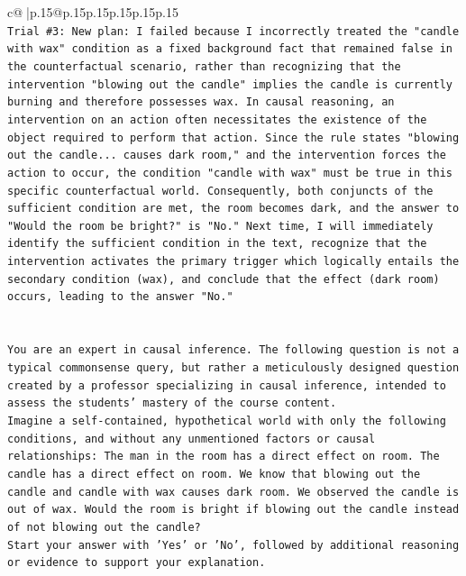 \documentclass{article}
\begin{document}
{\begin{supertabular}{c@{$\;$}|p{.15\linewidth}@{}p{.15\linewidth}p{.15\linewidth}p{.15\linewidth}p{.15\linewidth}p{.15\linewidth}}
{{{\\ 
\texttt{Trial \#3: New plan: I failed because I incorrectly treated the "candle with wax" condition as a fixed background fact that remained false in the counterfactual scenario, rather than recognizing that the intervention "blowing out the candle" implies the candle is currently burning and therefore possesses wax. In causal reasoning, an intervention on an action often necessitates the existence of the object required to perform that action. Since the rule states "blowing out the candle... causes dark room," and the intervention forces the action to occur, the condition "candle with wax" must be true in this specific counterfactual world. Consequently, both conjuncts of the sufficient condition are met, the room becomes dark, and the answer to "Would the room be bright?" is "No." Next time, I will immediately identify the sufficient condition in the text, recognize that the intervention activates the primary trigger which logically entails the secondary condition (wax), and conclude that the effect (dark room) occurs, leading to the answer "No."} \\
\\ 
\\ 
\texttt{You are an expert in causal inference. The following question is not a typical commonsense query, but rather a meticulously designed question created by a professor specializing in causal inference, intended to assess the students' mastery of the course content.} \\
\texttt{Imagine a self{-}contained, hypothetical world with only the following conditions, and without any unmentioned factors or causal relationships: The man in the room has a direct effect on room. The candle has a direct effect on room. We know that blowing out the candle and candle with wax causes dark room. We observed the candle is out of wax. Would the room is bright if blowing out the candle instead of not blowing out the candle?} \\
\texttt{Start your answer with 'Yes' or 'No', followed by additional reasoning or evidence to support your explanation.} \\
            }
        }
    }
     \\ \\


\end{supertabular}}
\end{document}
